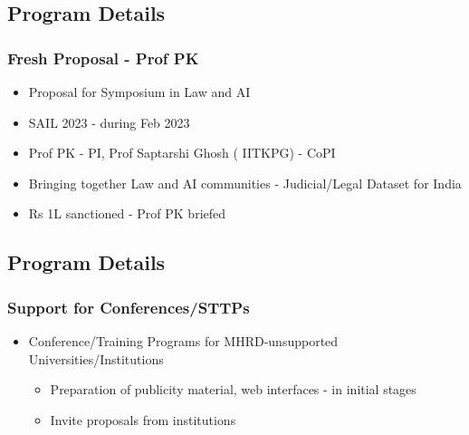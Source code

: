 \documentclass[aspectratio=169]{beamer}
\begin{document}
\subsection{Program Details}
\begin{frame}[fragile=singleslide]{\insertsectionhead}
  \frametitle {Fresh Proposal - Prof PK}
\begin{center}
\begin{itemize}
\item Proposal for Symposium in Law and AI
\item SAIL 2023 - during Feb 2023
\item Prof PK - PI, Prof Saptarshi Ghosh ( IITKPG) - CoPI
\item Bringing together Law and AI communities - Judicial/Legal Dataset for India
\item Rs 1L sanctioned - Prof PK briefed
\end{itemize}
\end{center}
\end{frame}


\subsection{Program Details}
\begin{frame}[fragile=singleslide]{\insertsectionhead}
  \frametitle {Support for Conferences/STTPs}
\begin{center}
\begin{itemize}
\item Conference/Training Programs for MHRD-unsupported Universities/Institutions
\begin{itemize}
\item Preparation of publicity material, web interfaces - in initial stages
\item Invite proposals from institutions
\end{itemize}
\end{itemize}
\end{center}
\end{frame}
\end{document}
